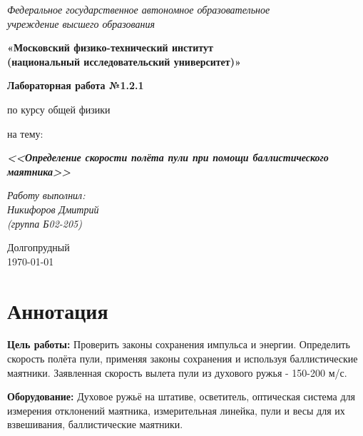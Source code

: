 \documentclass[a4paper,14pt]{extarticle}
\begin{document}
	\begin{center}
		\textit{Федеральное государственное автономное образовательное\\ учреждение высшего образования }
		
		\vspace{0.5ex}
		
		\textbf{«Московский физико-технический институт\\ (национальный исследовательский университет)»}
	\end{center}
	
	\vspace{10ex}
	
	
	\begin{center}
		\vspace{13ex}
		
		\textbf{Лабораторная работа №1.2.1}
		
		\vspace{1ex}
		
		по курсу общей физики
		
		на тему:
		
		\textbf{\textit{<<Определение скорости полёта пули при помощи баллистического маятника>>}}
		
		\vspace{30ex}
		
		\begin{flushright}
			\noindent
			\textit{Работу выполнил:}\\  
			\textit{Никифоров Дмитрий \\(группа Б02-205)}
		\end{flushright}
		\vfill
		Долгопрудный \\ \today
		
	\end{center}
	
	\section{Аннотация}
	
	\textbf{Цель работы:}
	Проверить законы сохранения импульса и энергии.
	Определить скорость полёта пули, применяя законы сохранения и используя баллистические маятники.
	\newline Заявленная скорость вылета пули из духового ружья - 150-200 м/с.
	
	\noindent\textbf{Оборудование:}
	Духовое ружьё на штативе, осветитель, оптическая система для измерения отклонений маятника, измерительная линейка, пули и весы для их взвешивания, баллистические маятники.
	\newcommand{\RomanNumeralCaps}[1]
	{\MakeUppercase{\romannumeral #1}}
\end{document}
